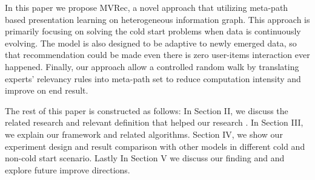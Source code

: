 In this paper we propose MVRec, a novel approach that utilizing meta-path based presentation learning on heterogeneous information graph. This approach is primarily focusing on solving the cold start problems when data is continuously evolving. The model is also designed to be adaptive to newly emerged data, so that recommendation could be made even there is zero user-items interaction ever happened. Finally, our approach allow a controlled random walk by translating experts' relevancy rules into meta-path set to reduce computation intensity and improve on end result. 

The rest of this paper is constructed as follows: In Section II, we discuss the related research and relevant definition that helped our research . In Section III, we explain our framework and related algorithms. Section IV, we show our experiment design and result comparison with other models in different cold and non-cold start scenario. Lastly In Section V we discuss our finding and and explore future improve directions.
